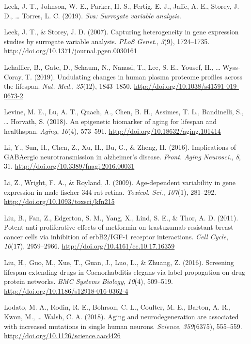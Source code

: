 \documentclass[12pt,twoside]{unicam}
\begin{document}
\begin{cslreferences}
\leavevmode\hypertarget{ref-svapack}{}%
Leek, J. T., Johnson, W. E., Parker, H. S., Fertig, E. J., Jaffe, A. E., Storey, J. D., \ldots{} Torres, L. C. (2019). \emph{Sva: Surrogate variable analysis}.

\leavevmode\hypertarget{ref-Leek2007}{}%
Leek, J. T., \& Storey, J. D. (2007). Capturing heterogeneity in gene expression studies by surrogate variable analysis. \emph{PLoS Genet.}, \emph{3}(9), 1724--1735. \url{http://doi.org/10.1371/journal.pgen.0030161}

\leavevmode\hypertarget{ref-Lehallier2019}{}%
Lehallier, B., Gate, D., Schaum, N., Nanasi, T., Lee, S. E., Yousef, H., \ldots{} Wyss-Coray, T. (2019). Undulating changes in human plasma proteome profiles across the lifespan. \emph{Nat. Med.}, \emph{25}(12), 1843--1850. \url{http://doi.org/10.1038/s41591-019-0673-2}

\leavevmode\hypertarget{ref-Levine2018}{}%
Levine, M. E., Lu, A. T., Quach, A., Chen, B. H., Assimes, T. L., Bandinelli, S., \ldots{} Horvath, S. (2018). An epigenetic biomarker of aging for lifespan and healthspan. \emph{Aging}, \emph{10}(4), 573--591. \url{http://doi.org/10.18632/aging.101414}

\leavevmode\hypertarget{ref-Li2016}{}%
Li, Y., Sun, H., Chen, Z., Xu, H., Bu, G., \& Zheng, H. (2016). Implications of GABAergic neurotransmission in alzheimer's disease. \emph{Front. Aging Neurosci.}, \emph{8}, 31. \url{http://doi.org/10.3389/fnagi.2016.00031}

\leavevmode\hypertarget{ref-Li2009}{}%
Li, Z., Wright, F. A., \& Royland, J. (2009). Age-dependent variability in gene expression in male fischer 344 rat retina. \emph{Toxicol. Sci.}, \emph{107}(1), 281--292. \url{http://doi.org/10.1093/toxsci/kfn215}

\leavevmode\hypertarget{ref-Liu2011}{}%
Liu, B., Fan, Z., Edgerton, S. M., Yang, X., Lind, S. E., \& Thor, A. D. (2011). Potent anti-proliferative effects of metformin on trastuzumab-resistant breast cancer cells via inhibition of erbB2/IGF-1 receptor interactions. \emph{Cell Cycle}, \emph{10}(17), 2959--2966. \url{http://doi.org/10.4161/cc.10.17.16359}

\leavevmode\hypertarget{ref-Liu2016}{}%
Liu, H., Guo, M., Xue, T., Guan, J., Luo, L., \& Zhuang, Z. (2016). Screening lifespan-extending drugs in Caenorhabditis elegans via label propagation on drug-protein networks. \emph{BMC Systems Biology}, \emph{10}(4), 509--519. \url{http://doi.org/10.1186/s12918-016-0362-4}

\leavevmode\hypertarget{ref-Lodato2018}{}%
Lodato, M. A., Rodin, R. E., Bohrson, C. L., Coulter, M. E., Barton, A. R., Kwon, M., \ldots{} Walsh, C. A. (2018). Aging and neurodegeneration are associated with increased mutations in single human neurons. \emph{Science}, \emph{359}(6375), 555--559. \url{http://doi.org/10.1126/science.aao4426}


\end{cslreferences}
\end{document}
